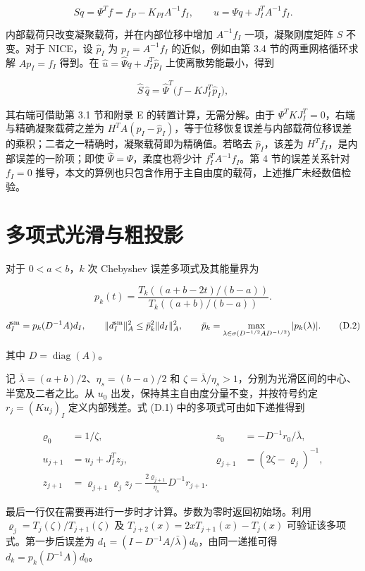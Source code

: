 \documentclass[preprint,12pt,authoryear]{elsarticle}
\begin{document}
\[
Sq=\Psi^Tf=f_P-K_{PI}A^{-1}f_I,\qquad u=\Psi q+J_I^TA^{-1}f_I .
\]

内部载荷只改变凝聚载荷，并在内部位移中增加 \(A^{-1}f_I\) 一项，凝聚刚度矩阵 \(S\) 不变。对于 NICE，设 \(\widehat p_I\) 为 \(p_I=A^{-1}f_I\) 的近似，例如由第 3.4 节的两重网格循环求解 \(Ap_I=f_I\) 得到。在 \(\widehat u=\widehat\Psi q+J_I^T\widehat p_I\) 上使离散势能最小，得到

\[
\widehat S\,\widehat q=\widehat\Psi^T\big(f-KJ_I^T\widehat p_I\big),
\]

其右端可借助第 3.1 节和附录 E 的转置计算，无需分解。由于 \(\Psi^TKJ_I^T=0\)，右端与精确凝聚载荷之差为 \(H^TA(p_I-\widehat p_I)\)，等于位移恢复误差与内部载荷位移误差的乘积；二者之一精确时，凝聚载荷即为精确值。若略去 \(\widehat p_I\)，该差为 \(H^Tf_I\)，是内部误差的一阶项；即使 \(\widehat\Psi=\Psi\)，柔度也将少计 \(f_I^TA^{-1}f_I\)。第 4 节的误差关系针对 \(f_I=0\) 推导，本文的算例也只包含作用于主自由度的载荷，上述推广未经数值检验。

\section{多项式光滑与粗投影}

对于 \(0<a<b\)，\(k\) 次 Chebyshev 误差多项式及其能量界为

\[
p_k(t)=\frac{T_k((a+b-2t)/(b-a))}{T_k((a+b)/(b-a))}.
\tag{D.1}
\]

\[
d_I^{\rm sm}=p_k(D^{-1}A)d_I,\qquad
\|d_I^{\rm sm}\|_A^2\le\bar p_k^2\|d_I\|_A^2,\qquad
\bar p_k=\max_{\lambda\in\sigma(D^{-1/2}AD^{-1/2})}|p_k(\lambda)|.
\tag{D.2}
\]

其中 \(D=\operatorname{diag}(A)\)。

记 \(\bar\lambda=(a+b)/2\)、\(\eta_s=(b-a)/2\) 和 \(\zeta=\bar\lambda/\eta_s>1\)，分别为光滑区间的中心、半宽及二者之比。从 \(u_0\) 出发，保持其主自由度分量不变，并按符号约定 \(r_j=(Ku_j)_I\) 定义内部残差。式 (D.1) 中的多项式可由如下递推得到

\[
\begin{aligned}
\varrho_0&=1/\zeta,& z_0&=-D^{-1}r_0/\bar\lambda,\\
u_{j+1}&=u_j+J_I^Tz_j,&
\varrho_{j+1}&=(2\zeta-\varrho_j)^{-1},\\
z_{j+1}&=\varrho_{j+1}\varrho_j z_j
 -\frac{2\varrho_{j+1}}{\eta_s}D^{-1}r_{j+1}.
\end{aligned}
\tag{D.3}
\]

最后一行仅在需要再进行一步时才计算。步数为零时返回初始场。利用 \(\varrho_j=T_j(\zeta)/T_{j+1}(\zeta)\) 及 \(T_{j+2}(x)=2xT_{j+1}(x)-T_j(x)\) 可验证该多项式。第一步后误差为 \(d_1=(I-D^{-1}A/\bar\lambda)d_0\)，由同一递推可得 \(d_k=p_k(D^{-1}A)d_0\)。
\end{document}
